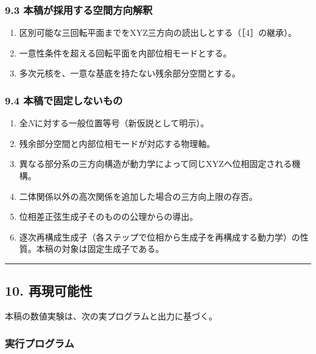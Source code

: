 \documentclass[
  a4paper,
]{ltjsarticle}
\providecommand{\tightlist}{%
  \setlength{\itemsep}{0pt}\setlength{\parskip}{0pt}}
\begin{document}
\subsubsection{9.3
本稿が採用する空間方向解釈}\label{ux672cux7a3fux304cux63a1ux7528ux3059ux308bux7a7aux9593ux65b9ux5411ux89e3ux91c8}

\begin{enumerate}
\def\labelenumi{\arabic{enumi}.}
\tightlist
\item
  区別可能な三回転平面までをXYZ三方向の読出しとする（［4］の継承）。
\item
  一意性条件を超える回転平面を内部位相モードとする。
\item
  多次元核を、一意な基底を持たない残余部分空間とする。
\end{enumerate}

\subsubsection{9.4
本稿で固定しないもの}\label{ux672cux7a3fux3067ux56faux5b9aux3057ux306aux3044ux3082ux306e}

\begin{enumerate}
\def\labelenumi{\arabic{enumi}.}
\tightlist
\item
  全\(N\)に対する一般位置等号（新仮説として明示）。
\item
  残余部分空間と内部位相モードが対応する物理軸。
\item
  異なる部分系の三方向構造が動力学によって同じXYZへ位相固定される機構。
\item
  二体関係以外の高次関係を追加した場合の三方向上限の存否。
\item
  位相差正弦生成子そのものの公理からの導出。
\item
  逐次再構成生成子（各ステップで位相から生成子を再構成する動力学）の性質。本稿の対象は固定生成子である。
\end{enumerate}

\begin{center}\rule{0.5\linewidth}{0.5pt}\end{center}

\subsection{10. 再現可能性}\label{ux518dux73feux53efux80fdux6027}

本稿の数値実験は、次の実プログラムと出力に基づく。

\subsubsection{実行プログラム}\label{ux5b9fux884cux30d7ux30edux30b0ux30e9ux30e0}
\end{document}
